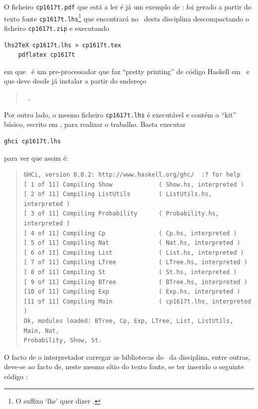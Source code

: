 \documentclass[a4paper]{article}
\begin{document}
O ficheiro \texttt{cp1617t.pdf} que está a ler é já um exemplo de : foi gerado a partir do texto fonte \texttt{cp1617t.lhs}\footnote{O
suffixo `lhs' quer dizer \emph{}.} que encontrará
no \MaterialPedagogico\ desta disciplina descompactando o ficheiro \texttt{cp1617t.zip}
e executando
\begin{Verbatim}[fontsize=\small]
    lhs2TeX cp1617t.lhs > cp1617t.tex
    pdflatex cp1617t
\end{Verbatim}
em que \texttt\LhsToTeX\ é um pre-processador que faz ``pretty printing''
de código Haskell em \Latex\ e que deve desde já instalar a partir do endereço
\begin{quote}\tt\small
{}.
\end{quote}
Por outro lado, o mesmo ficheiro \texttt{cp1617t.lhs} é executável e contém
o ``kit'' básico, escrito em \Haskell, para realizar o trabalho. Basta executar
\begin{Verbatim}[fontsize=\small]
    ghci cp1617t.lhs
\end{Verbatim}
para ver que assim é: 
\begin{quote}
\begin{Verbatim}[fontsize=\small]
GHCi, version 8.0.2: http://www.haskell.org/ghc/  :? for help
[ 1 of 11] Compiling Show             ( Show.hs, interpreted )
[ 2 of 11] Compiling ListUtils        ( ListUtils.hs, interpreted )
[ 3 of 11] Compiling Probability      ( Probability.hs, interpreted )
[ 4 of 11] Compiling Cp               ( Cp.hs, interpreted )
[ 5 of 11] Compiling Nat              ( Nat.hs, interpreted )
[ 6 of 11] Compiling List             ( List.hs, interpreted )
[ 7 of 11] Compiling LTree            ( LTree.hs, interpreted )
[ 8 of 11] Compiling St               ( St.hs, interpreted )
[ 9 of 11] Compiling BTree            ( BTree.hs, interpreted )
[10 of 11] Compiling Exp              ( Exp.hs, interpreted )
[11 of 11] Compiling Main             ( cp1617t.lhs, interpreted )
Ok, modules loaded: BTree, Cp, Exp, LTree, List, ListUtils, Main, Nat,
Probability, Show, St.
\end{Verbatim}
\end{quote}
O facto de o interpretador carregar as bibliotecas do \MaterialPedagogico\ da
disciplina, entre outras, deve-se ao facto de, neste mesmo sítio do texto
fonte, se ter inserido o seguinte código \Haskell:
\end{document}

